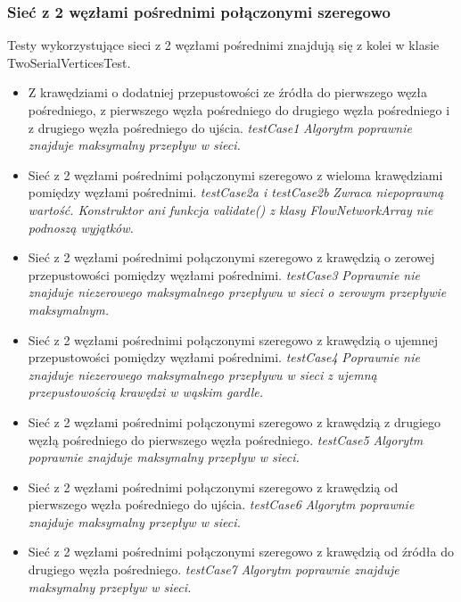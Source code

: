 \subsubsection{Sieć z 2 węzłami pośrednimi połączonymi szeregowo}
Testy wykorzystujące sieci z 2 węzłami pośrednimi znajdują się z kolei w klasie
TwoSerialVerticesTest.
\begin{itemize}[nosep]
    \item Z krawędziami o dodatniej przepustowości ze źródła do pierwszego węzła
    pośredniego, z pierwszego węzła pośredniego do drugiego węzła pośredniego i z
    drugiego węzła pośredniego do ujścia.
    \emph{testCase1}
    \emph{Algorytm
    poprawnie znajduje maksymalny przepływ w sieci.}

    \item Sieć z 2 węzłami pośrednimi połączonymi szeregowo z wieloma
    krawędziami pomiędzy węzłami pośrednimi.
    \emph{testCase2a i testCase2b}
    \emph{Zwraca niepoprawną wartość. Konstruktor ani funkcja validate()
    z klasy FlowNetworkArray nie podnoszą wyjątków.}

    \item Sieć z 2 węzłami pośrednimi połączonymi szeregowo z krawędzią o
    zerowej przepustowości pomiędzy węzłami pośrednimi.
    \emph{testCase3}
    \emph{Poprawnie
    nie znajduje niezerowego maksymalnego przepływu
    w sieci o zerowym przepływie maksymalnym.}

    \item Sieć z 2 węzłami pośrednimi połączonymi szeregowo z krawędzią o
    ujemnej przepustowości pomiędzy węzłami pośrednimi.
    \emph{testCase4}
    \emph{Poprawnie
    nie znajduje niezerowego maksymalnego przepływu
    w sieci z ujemną przepustowością krawędzi w wąskim gardle.}

    \item Sieć z 2 węzłami pośrednimi połączonymi szeregowo z krawędzią z
    drugiego węzłą pośredniego do pierwszego węzła pośredniego.
    \emph{testCase5}
    \emph{Algorytm
    poprawnie znajduje maksymalny przepływ w sieci.}

    \item Sieć z 2 węzłami pośrednimi połączonymi szeregowo z krawędzią od
    pierwszego węzła pośredniego do ujścia.
    \emph{testCase6}
    \emph{Algorytm
    poprawnie znajduje maksymalny przepływ w sieci.}

    \item Sieć z 2 węzłami pośrednimi połączonymi szeregowo z krawędzią od
    źródła do drugiego węzła pośredniego.
    \emph{testCase7}
    \emph{Algorytm
    poprawnie znajduje maksymalny przepływ w sieci.}

\end{itemize}


